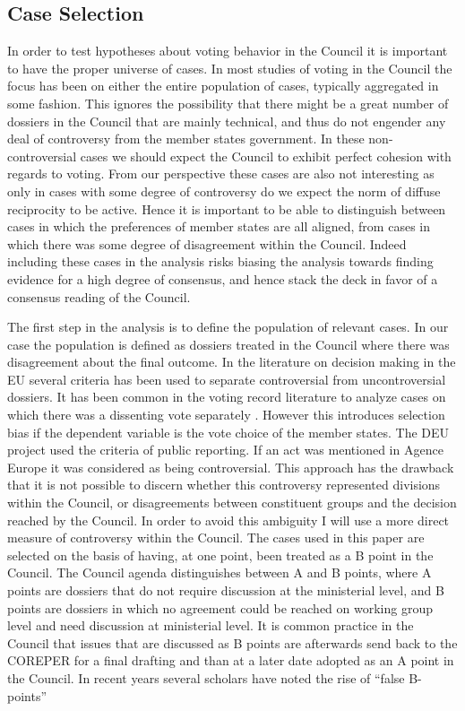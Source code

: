 \subsection{Case Selection}

In order to test hypotheses about voting behavior in the Council it is important to have the proper universe of cases. In most studies of voting in the Council the focus has been on either the entire population of cases, typically aggregated in some fashion. This ignores the possibility that there might be a great number of dossiers in the Council that are mainly technical, and thus do not engender any deal of controversy from the member states government. In these non-controversial cases we should expect the Council to exhibit perfect cohesion with regards to voting. From our perspective these cases are also not interesting as only in cases with some degree of controversy do we expect the norm of diffuse reciprocity to be active. Hence it is important to be able to distinguish between cases in which the preferences of member states are all aligned, from cases in which there was some degree of disagreement within the Council. Indeed including these cases in the analysis risks biasing the analysis towards finding evidence for a high degree of consensus, and hence stack the deck in favor of a consensus reading of the Council. 

The first step in the analysis is to define the population of relevant cases. In our case the population is defined as dossiers treated in the Council where there was disagreement about the final outcome. In the literature on decision making in the EU several criteria has been used to separate controversial from uncontroversial dossiers. It has been common in the voting record literature to analyze cases on which there was a dissenting vote separately \citep{Heisenberg2005,Hayes-renshaw2006,Hagemann2008}. However this introduces selection bias if the dependent variable is the vote choice of the member states. The DEU project \citep{Thomson2006a} used the criteria of public reporting. If an act was mentioned in Agence Europe it was considered as being controversial. This approach has the drawback that it is not possible to discern whether this controversy represented divisions within the Council, or disagreements between constituent groups and the decision reached by the Council. In order to avoid this ambiguity I will use a more direct measure of controversy within the Council. The cases used in this paper are selected on the basis of having, at one point, been treated as a B point in the Council. The Council agenda distinguishes between A and B points, where A points are dossiers that do not require discussion at the ministerial level, and B points are dossiers in which no agreement could be reached on working group level and need discussion at ministerial level. It is common practice in the Council that issues that are discussed as B points are afterwards send back to the COREPER for a final drafting and than at a later date adopted as an A point in the Council. In recent years several scholars have noted the rise of ``false B-points'' \citep{Muehlbock2011} 

